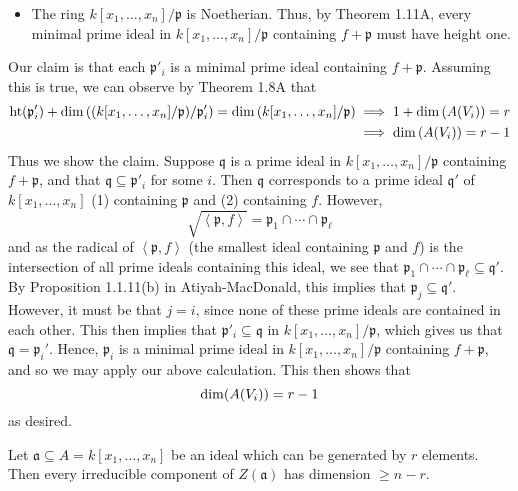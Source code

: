 \documentclass{/Users/SHER/Documents/Hartshorne-Exercises/hw_pset} %
\DeclareMathOperator{\Ht}{\rm{ht}}    %
\DeclareMathOperator{\Dim}{\rm{dim}}  %
\newcommand{\x}{x_1, \dots, x_n}    %
\newcommand{\idl}[1]{\mathfrak{#1}} %
\begin{document}
\begin{solution}
\begin{itemize}
        \item The ring $k[\x]/\idl{p}$ is Noetherian. Thus, by 
        Theorem 1.11A, every minimal prime ideal in $k[\x]/\idl{p}$
        containing $f + \idl{p}$ must have height one.
    \end{itemize}
    Our claim is that each $\idl{p}'_i$ is a minimal prime ideal 
    containing $f + \idl{p}$. Assuming this is true, we can observe 
    by Theorem 1.8A that 
    \begin{align*}
        \Ht(\idl{p}_i') + \Dim\left( (k[\x]/\idl{p})/\idl{p}'_i \right) = \Dim\left( k[\x]/\idl{p} \right)
        &\implies 
        1 +  \Dim\left( A(V_i) \right) = r\\
        &\implies 
        \Dim\left( A(V_i) \right) = r - 1
    \end{align*}
    Thus we show the claim. Suppose $\idl{q}$ is a prime ideal in $k[\x]/\idl{p}$ 
    containing $f + \idl{p}$, and that $\idl{q} \subseteq \idl{p}'_i$ for some $i$. 
    Then $\idl{q}$ corresponds to a prime ideal $\idl{q}'$ of $k[\x]$ (1) containing $\idl{p}$ and (2) 
    containing $f$. However, 
    \[
        \sqrt{\left<\idl{p}, f\right>} = \idl{p}_1 \cap \cdots \cap \idl{p}_{\ell}
    \]
    and as the radical of $\left<\idl{p}, f\right>$ (the smallest ideal containing $\idl{p}$ and $f$)
    is the intersection of all prime ideals containing this ideal, we see that 
    $\idl{p}_1 \cap \cdots \cap \idl{p}_{\ell} \subseteq \idl{q}'$. By Proposition 1.1.11(b) in Atiyah-MacDonald, 
    this implies that $\idl{p}_j \subseteq \idl{q}'$. However, it must be that 
    $j = i$, since none of these prime ideals 
    are contained in each other. This then implies that 
    $\idl{p}'_i \subseteq \idl{q}$ in $k[\x]/\idl{p}$, which gives us that $\idl{q} = \idl{p}_i'$. 
    Hence, $\idl{p}_i$ is a minimal prime ideal in $k[\x]/\idl{p}$ containing $f+\idl{p}$, and 
    so we may apply our above calculation. This then shows that 
    \[
        \Dim(A(V_i)) = r - 1  
    \]
    as desired.
\end{solution}

\begin{exercise}[1.9]
    Let $\mathfrak{a} \subseteq A = k[x_1,\ldots,x_n]$ be an ideal which can be
    generated by $r$ elements.
    Then every irreducible component of $Z(\mathfrak{a})$ has dimension $\ge n-r$.
\end{exercise}
\end{document}
